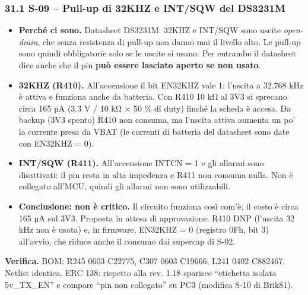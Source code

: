 \subsubsection[31.1 S-09 – Pull-up di 32KHZ e INT/\allowbreak{}SQW del DS3231M]{31.1 S-09 – Pull-up di 32KHZ e INT/\allowbreak{}SQW del DS3231M}

\begin{itemize}
\item \textbf{Perché ci sono.} Datasheet DS3231M: 32KHZ e INT/\allowbreak{}SQW sono uscite \textit{open-drain}, che senza resistenza di pull-up non danno mai il livello alto. Le pull-up sono quindi obbligatorie solo se le uscite si usano. Per entrambe il datasheet dice anche che il pin \textbf{può essere lasciato aperto se non usato}.
\item \textbf{32KHZ (R410).} All'accensione il bit EN32KHZ vale 1: l'uscita a 32.768 kHz è attiva e funziona anche da batteria. Con R410 10 kΩ al 3V3 si sprecano circa 165 µA (3.3 V /\allowbreak{} 10 kΩ × 50 \% di duty) finché la scheda è accesa. Da backup (3V3 spento) R410 non consuma, ma l'uscita attiva aumenta un po' la corrente presa da VBAT (le correnti di batteria del datasheet sono date con EN32KHZ = 0).
\item \textbf{INT/\allowbreak{}SQW (R411).} All'accensione INTCN = 1 e gli allarmi sono disattivati: il pin resta in alta impedenza e R411 non consuma nulla. Non è collegato all'MCU, quindi gli allarmi non sono utilizzabili.
\item \textbf{Conclusione: non è critico.} Il circuito funziona così com'è; il costo è circa 165 µA sul 3V3. Proposta in attesa di approvazione: R410 DNP (l'uscita 32 kHz non è usata) e, in firmware, EN32KHZ = 0 (registro 0Fh, bit 3) all'avvio, che riduce anche il consumo dai supercap di S-02.
\end{itemize}

\textbf{Verifica.} BOM: R245 0603 C22775, C307 0603 C19666, L241 0402 C882467. Netlist identica. ERC 138: rispetto alla rev. 1.18 sparisce \textquotedblleft{}etichetta isolata 5v\_\allowbreak{}TX\_\allowbreak{}EN\textquotedblright{} e compare \textquotedblleft{}pin non collegato\textquotedblright{} su PC3 (modifica S-10 di Brik81).
